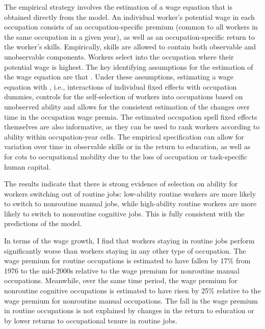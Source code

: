 \documentclass[12pt]{article}
\newcommand{\highlightB}[1]{{\emph{\color{MyBlue}{#1}}}}
\newcommand{\highlightO}[1]{{\emph{\color{MyOrange}{#1}}}}
\theoremstyle{definition}
\begin{document}
The empirical strategy involves the estimation of a wage equation that is obtained directly from the model. An individual worker's potential wage in each occupation consists of an occupation-specific premium (common to all workers in the same occupation in a given year), as well as an occupation-specific return to the worker's skills. Empirically, skills are allowed to contain both observable and unobservable components. Workers select into the occupation where their potential wage is highest. The key identifying assumptions for the estimation of the wage equation are that \highlightO{(i) unobservable skills and their return are time-invariant, (ii) workers have full information about their skills, and (iii) any idiosyncratic temporary shocks to individual wages are independent of sectoral choice}. Under these assumptions, estimating a wage equation with \highlightB{occupation spell fixed effects}, i.e., interactions of individual fixed effects with occupation dummies, controls for the self-selection of workers into occupations based on unobserved ability and allows for the consistent estimation of the changes over time in the occupation wage premia. The estimated occupation spell fixed effects themselves are also informative, as they can be used to rank workers according to ability within occupation-year cells. The empirical specification can allow for variation over time in observable skills or in the return to education, as well as for cots to occupational mobility due to the loss of occupation or task-specific human capital. 

The results indicate that there is strong evidence of selection on ability for workers switching out of routine jobs: low-ability routine workers are more likely to switch to nonroutine manual jobs, while high-ability routine workers are more likely to switch to nonroutine cognitive jobs. This is fully consistent with the predictions of the model. 

In terms of the wage growth, I find that workers staying in routine jobs perform significantly worse than workers staying in any other type of occupation. The wage premium for routine occupations is estimated to have fallen by 17\% from 1976 to the mid-2000s relative to the wage premium for nonroutine manual occupations. Meanwhile, over the same time period, the wage premium for nonroutine cognitive occupations is estimated to have risen by 25\% relative to the wage premium for nonroutine manual occupations. The fall in the wage premium in routine occupations is not explained by changes in the return to education or by lower returns to occupational tenure in routine jobs. 
\end{document}
